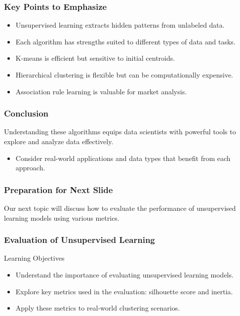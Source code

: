 \documentclass[aspectratio=169]{beamer}
\begin{document}
\begin{frame}[fragile]
    \frametitle{Key Points to Emphasize}
    \begin{itemize}
        \item Unsupervised learning extracts hidden patterns from unlabeled data.
        \item Each algorithm has strengths suited to different types of data and tasks.
        \item K-means is efficient but sensitive to initial centroids.
        \item Hierarchical clustering is flexible but can be computationally expensive.
        \item Association rule learning is valuable for market analysis.
    \end{itemize}
\end{frame}

\begin{frame}[fragile]
    \frametitle{Conclusion}
    Understanding these algorithms equips data scientists with powerful tools to explore and analyze data effectively.
    \begin{itemize}
        \item Consider real-world applications and data types that benefit from each approach.
    \end{itemize}
\end{frame}

\begin{frame}[fragile]
    \frametitle{Preparation for Next Slide}
    Our next topic will discuss how to evaluate the performance of unsupervised learning models using various metrics.
\end{frame}

\begin{frame}[fragile]
    \frametitle{Evaluation of Unsupervised Learning}
    \begin{block}{Learning Objectives}
        \begin{itemize}
            \item Understand the importance of evaluating unsupervised learning models.
            \item Explore key metrics used in the evaluation: silhouette score and inertia.
            \item Apply these metrics to real-world clustering scenarios.
        \end{itemize}
    \end{block}
\end{frame}
\end{document}
